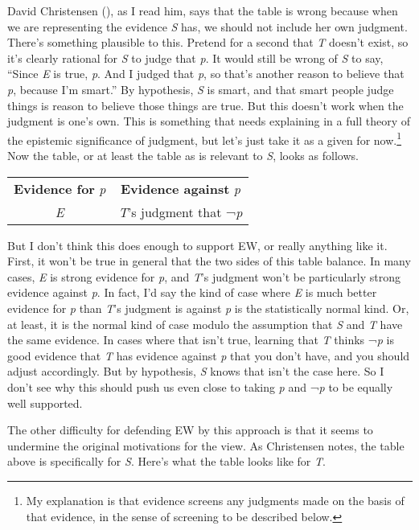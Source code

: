\documentclass[
  10pt,
  letterpaper,
  DIV=11,
  numbers=noendperiod,
  twoside]{scrartcl}
\begin{document}
David Christensen (), as I
read him, says that the table is wrong because when we are representing
the evidence \emph{S} has, we should not include her own judgment.
There's something plausible to this. Pretend for a second that \emph{T}
doesn't exist, so it's clearly rational for \emph{S} to judge that
\emph{p}. It would still be wrong of \emph{S} to say, ``Since \emph{E}
is true, \emph{p}. And I judged that \emph{p}, so that's another reason
to believe that \emph{p}, because I'm smart.'' By hypothesis, \emph{S}
is smart, and that smart people judge things is reason to believe those
things are true. But this doesn't work when the judgment is one's own.
This is something that needs explaining in a full theory of the
epistemic significance of judgment, but let's just take it as a given
for now.\footnote{My explanation is that evidence screens any judgments
  made on the basis of that evidence, in the sense of screening to be
  described below.} Now the table, or at least the table as is relevant
to \emph{S}, looks as follows.

\begin{longtable}[]{@{}cc@{}}
\toprule\noalign{}
\endhead
\bottomrule\noalign{}
\endlastfoot
\textbf{Evidence for} \emph{p} & \textbf{Evidence against} \emph{p} \\
\emph{E} & \emph{T}'s judgment that ¬\emph{p} \\
\end{longtable}

But I don't think this does enough to support EW, or really anything
like it. First, it won't be true in general that the two sides of this
table balance. In many cases, \emph{E} is strong evidence for \emph{p},
and \emph{T}'s judgment won't be particularly strong evidence against
\emph{p}. In fact, I'd say the kind of case where \emph{E} is much
better evidence for \emph{p} than \emph{T}'s judgment is against
\emph{p} is the statistically normal kind. Or, at least, it is the
normal kind of case modulo the assumption that \emph{S} and \emph{T}
have the same evidence. In cases where that isn't true, learning that
\emph{T} thinks ¬\emph{p} is good evidence that \emph{T} has evidence
against \emph{p} that you don't have, and you should adjust accordingly.
But by hypothesis, \emph{S} knows that isn't the case here. So I don't
see why this should push us even close to taking \emph{p} and ¬\emph{p}
to be equally well supported.

The other difficulty for defending EW by this approach is that it seems
to undermine the original motivations for the view. As Christensen
notes, the table above is specifically for \emph{S}. Here's what the
table looks like for \emph{T}.
\end{document}
